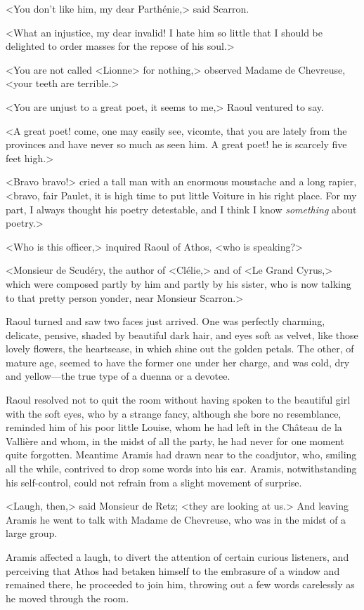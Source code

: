 <You don't like him, my dear Parthénie,> said Scarron.

<What an injustice, my dear invalid! I hate him so little that I should be delighted to order masses for the repose of his soul.>

<You are not called <Lionne> for nothing,> observed Madame de Chevreuse, <your teeth are terrible.>

<You are unjust to a great poet, it seems to me,> Raoul ventured to say.

<A great poet! come, one may easily see, vicomte, that you are lately from the provinces and have never so much as seen him. A great poet! he is scarcely five feet high.>

<Bravo bravo!> cried a tall man with an enormous moustache and a long rapier, <bravo, fair Paulet, it is high time to put little Voiture in his right place. For my part, I always thought his poetry detestable, and I think I know \textit{something} about poetry.>

<Who is this officer,> inquired Raoul of Athos, <who is speaking?>

<Monsieur de Scudéry, the author of <Clélie,> and of <Le Grand Cyrus,> which were composed partly by him and partly by his sister, who is now talking to that pretty person yonder, near Monsieur Scarron.>

Raoul turned and saw two faces just arrived. One was perfectly charming, delicate, pensive, shaded by beautiful dark hair, and eyes soft as velvet, like those lovely flowers, the heartsease, in which shine out the golden petals. The other, of mature age, seemed to have the former one under her charge, and was cold, dry and yellow—the true type of a duenna or a devotee.

Raoul resolved not to quit the room without having spoken to the beautiful girl with the soft eyes, who by a strange fancy, although she bore no resemblance, reminded him of his poor little Louise, whom he had left in the Château de la Vallière and whom, in the midst of all the party, he had never for one moment quite forgotten. Meantime Aramis had drawn near to the coadjutor, who, smiling all the while, contrived to drop some words into his ear. Aramis, notwithstanding his self-control, could not refrain from a slight movement of surprise.

<Laugh, then,> said Monsieur de Retz; <they are looking at us.> And leaving Aramis he went to talk with Madame de Chevreuse, who was in the midst of a large group.

Aramis affected a laugh, to divert the attention of certain curious listeners, and perceiving that Athos had betaken himself to the embrasure of a window and remained there, he proceeded to join him, throwing out a few words carelessly as he moved through the room.

